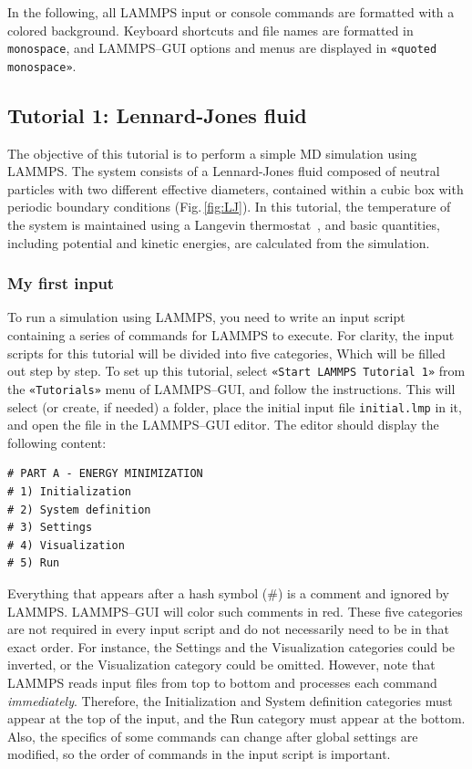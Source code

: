 \documentclass[9pt,tutorial]{livecoms}
\newcommand{\lmpcmd}[1]{\hspace{0pt}\colorbox{listing}{\textcolor{command}{\small{#1}}}\hspace{0pt}} %
\newcommand{\flecmd}[1]{\textcolor{command}{\texttt{#1}}} %
\newcommand{\guicmd}[1]{\textcolor{command}{\texttt{«#1»}}} %
\begin{document}
In the following, all LAMMPS input or console commands are formatted
with a \lmpcmd{colored background}.  Keyboard shortcuts and 
file names are formatted in \flecmd{monospace}, and LAMMPS--GUI options and menus
are displayed in \guicmd{quoted monospace}.

\subsection{Tutorial 1: Lennard-Jones fluid}
\label{lennard-jones-label}

The objective of this tutorial is to perform a simple MD simulation
using LAMMPS.  The system consists of a Lennard-Jones fluid composed of neutral
particles with two different effective diameters, contained within a
cubic box with periodic boundary conditions (Fig.\,\ref{fig:LJ}).  In
this tutorial, the temperature of the system is maintained using a
Langevin thermostat~\cite{schneider1978molecular}, and basic quantities,
including potential and kinetic energies, are calculated from the simulation.

\subsubsection{My first input}

To run a simulation using LAMMPS, you need to write an input script containing
a series of commands for LAMMPS to execute.  For clarity, the
input scripts for this tutorial will be divided into five categories,
Which will be filled out step by step.  To set up this tutorial, select
\guicmd{Start LAMMPS Tutorial 1} from the \guicmd{Tutorials} menu of LAMMPS--GUI, and
follow the instructions.  This will select (or create, if needed) a folder,
place the initial input file \flecmd{initial.lmp} in it, and
open the file in the LAMMPS--GUI editor.  The editor should display the
following content:
\begin{lstlisting}
# PART A - ENERGY MINIMIZATION
# 1) Initialization
# 2) System definition
# 3) Settings
# 4) Visualization
# 5) Run
\end{lstlisting}

Everything that appears after a hash symbol ($\#$) is a comment
and ignored by LAMMPS.  LAMMPS--GUI will color such comments in red.
These five categories are not required in every input script and do not
necessarily need to be in that exact order.  For instance, the \lmpcmd{Settings}
and the \lmpcmd{Visualization} categories could be inverted, or
the \lmpcmd{Visualization} category could be omitted.  However, note that
LAMMPS reads input files from top to bottom and processes each command
\emph{immediately}.  Therefore, the \lmpcmd{Initialization} and
\lmpcmd{System definition} categories must appear at the top of the
input, and the \lmpcmd{Run} category must appear at the bottom.  Also, the
specifics of some commands can change after global settings are modified, so the
order of commands in the input script is important.
\end{document}
